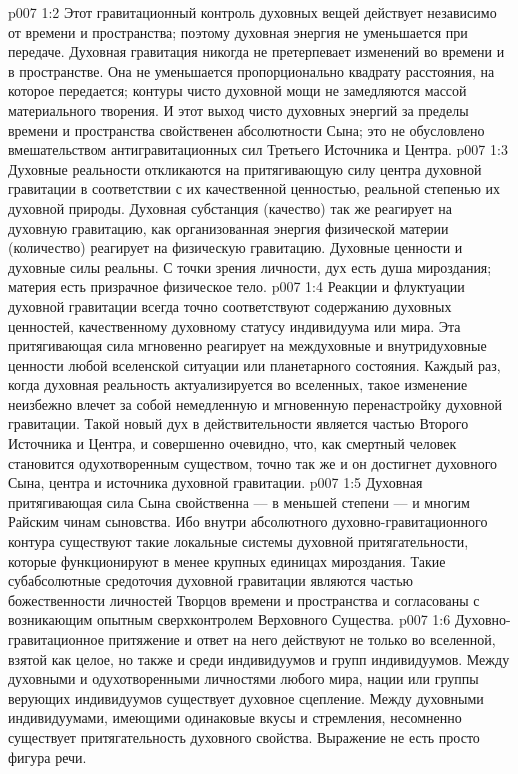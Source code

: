 \vs p007 1:2 Этот гравитационный контроль духовных вещей действует независимо от времени и пространства; поэтому духовная энергия не уменьшается при передаче. Духовная гравитация никогда не претерпевает изменений во времени и в пространстве. Она не уменьшается пропорционально квадрату расстояния, на которое передается; контуры чисто духовной мощи не замедляются массой материального творения. И этот выход чисто духовных энергий за пределы времени и пространства свойственен абсолютности Сына; это не обусловлено вмешательством антигравитационных сил Третьего Источника и Центра.
\vs p007 1:3 Духовные реальности откликаются на притягивающую силу центра духовной гравитации в соответствии с их качественной ценностью, реальной степенью их духовной природы. Духовная субстанция (качество) так же реагирует на духовную гравитацию, как организованная энергия физической материи (количество) реагирует на физическую гравитацию. Духовные ценности и духовные силы реальны. С точки зрения личности, дух есть душа мироздания; материя есть призрачное физическое тело.
\vs p007 1:4 Реакции и флуктуации духовной гравитации всегда точно соответствуют содержанию духовных ценностей, качественному духовному статусу индивидуума или мира. Эта притягивающая сила мгновенно реагирует на междуховные и внутридуховные ценности любой вселенской ситуации или планетарного состояния. Каждый раз, когда духовная реальность актуализируется во вселенных, такое изменение неизбежно влечет за собой немедленную и мгновенную перенастройку духовной гравитации. Такой новый дух в действительности является частью Второго Источника и Центра, и совершенно очевидно, что, как смертный человек становится одухотворенным существом, точно так же и он достигнет духовного Сына, центра и источника духовной гравитации.
\vs p007 1:5 \pc Духовная притягивающая сила Сына свойственна --- в меньшей степени --- и многим Райским чинам сыновства. Ибо внутри абсолютного духовно\hyp{}гравитационного контура существуют такие локальные системы духовной притягательности, которые функционируют в менее крупных единицах мироздания. Такие субабсолютные средоточия духовной гравитации являются частью божественности личностей Творцов времени и пространства и согласованы с возникающим опытным сверхконтролем Верховного Существа.
\vs p007 1:6 Духовно\hyp{}гравитационное притяжение и ответ на него действуют не только во вселенной, взятой как целое, но также и среди индивидуумов и групп индивидуумов. Между духовными и одухотворенными личностями любого мира, нации или группы верующих индивидуумов существует духовное сцепление. Между духовными индивидуумами, имеющими одинаковые вкусы и стремления, несомненно существует притягательность духовного свойства. Выражение  не есть просто фигура речи.
